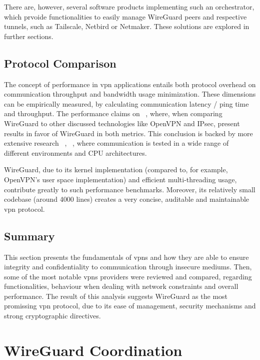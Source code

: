 \documentclass[11pt,twoside,a4paper]{report}
\begin{document}
There are, however, several software products implementing such an orchestrator, which prvoide functionalities to easily manage WireGuard peers and respective tunnels, such as Tailscale, Netbird or Netmaker. These solutions are explored in further sections.


\subsection{Protocol Comparison}

The concept of performance in \ac{vpn} applications entails both protocol overhead on communication throughput and bandwidth usage minimization. These dimensions can be empirically measured, by calculating communication latency / ping time and throughput. The performance claims on ~\cite{donenfeld2017wireguard}, where, when comparing WireGuard to other discussed technologies like OpenVPN and IPsec, present results in favor of WireGuard in both metrics. This conclusion is backed by more extensive research ~\cite{mackey2020performance}, ~\cite{osswald2020performance}, where communication is tested in a wide range of different environments and CPU architectures.

WireGuard, due to its kernel implementation (compared to, for example, OpenVPN's user space implementation) and efficient multi-threading usage, contribute greatly to such performance benchmarks. Moreover, its relatively small codebase (around 4000 lines) creates a very concise, auditable and maintainable \ac{vpn} protocol.

\subsection{Summary}

This section presents the fundamentals of \acp{vpn} and how they are able to ensure integrity and confidentiality to communication through insecure mediums. Then, some of the most notable \acp{vpn} providers were reviewed and compared, regarding functionalities, behaviour when dealing with network constraints and overall performance. The result of this analysis suggests WireGuard as the most promissing \ac{vpn} protocol, due to its ease of management, security mechanisms and strong cryptographic directives.


\section{WireGuard Coordination}
\label{sec:coordination}
\end{document}
